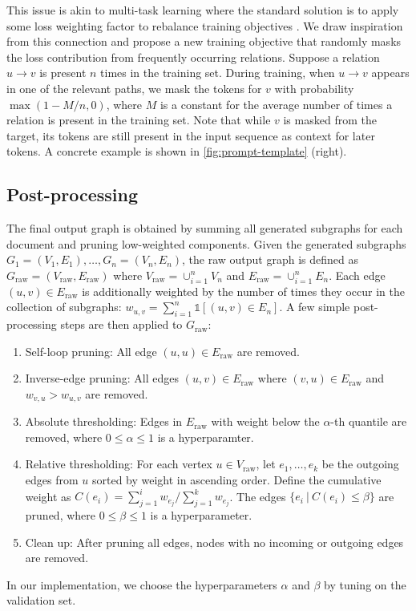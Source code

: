 This issue is akin to multi-task learning \cite{caruana1997multitask} where the standard solution is to apply some loss weighting factor to rebalance training objectives \cite{sermanet2013overfeat,kendall2018multi}. We draw inspiration from this connection and propose a new training objective that randomly masks the loss contribution from frequently occurring relations. Suppose a relation $u \to v$ is present $n$ times in the training set. During training, when $u \to v$ appears in one of the relevant paths, we mask the tokens for $v$ with probability $\max(1 - M/n, 0)$, where $M$ is a constant for the average number of times a relation is present in the training set. Note that while $v$ is masked from the target, its tokens are still present in the input sequence as context for later tokens. A concrete example is shown in \cref{fig:prompt-template} (right).

\subsection{Post-processing}  \label{sec:method:post-processing}

The final output graph is obtained by summing all generated subgraphs for each document and pruning low-weighted components. Given the generated subgraphs $G_1 = (V_1, E_1), \dots, G_n = (V_n, E_n)$, the raw output graph is defined as $G_{\text{raw}} = (V_{\text{raw}}, E_{\text{raw}})$ where $V_\text{raw} = \cup_{i=1}^n V_n$ and $E_\text{raw} = \cup_{i=1}^n E_n$. Each edge $(u, v) \in E_\text{raw}$ is additionally weighted by the number of times they occur in the collection of subgraphs: $w_{u, v} = \sum_{i=1}^n \mathbb{1}[(u,v) \in E_n]$. A few simple post-processing steps are then applied to $G_\text{raw}$:
\begin{enumerate}
    \item Self-loop pruning: All edge $(u, u) \in E_\text{raw}$ are removed.
    \item Inverse-edge pruning: All edges $(u, v) \in E_\text{raw}$ where $(v, u) \in E_\text{raw}$ and $w_{v, u} > w_{u, v}$ are removed.
    \item Absolute thresholding: Edges in $E_\text{raw}$ with weight below the $\alpha$-th quantile are removed, where $0 \leq \alpha \leq 1$ is a hyperparamter.
    \item Relative thresholding: For each vertex $u \in V_\text{raw}$, let $e_1, \dots, e_k$ be the outgoing edges from $u$ sorted by weight in ascending order. Define the cumulative weight as $C(e_i) = \sum_{j=1}^i w_{e_j} / \sum_{j=1}^k w_{e_j}$. The edges $\{e_i\ |\ C(e_i) \leq \beta\}$ are pruned, where $0 \leq \beta \leq 1$ is a hyperparameter.
    \item Clean up: After pruning all edges, nodes with no incoming or outgoing edges are removed.
\end{enumerate}
In our implementation, we choose the hyperparameters $\alpha$ and $\beta$ by tuning on the validation set.

